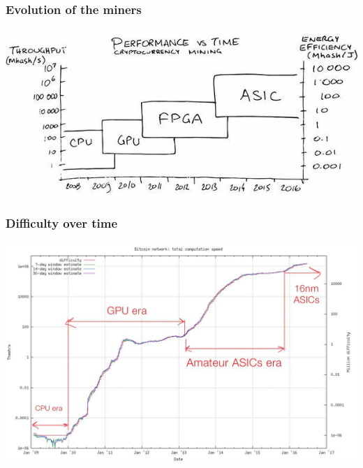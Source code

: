 \documentclass[11pt]{beamer}  %
\begin{document}
\begin{frame}\frametitle{Evolution of the miners}

  \begin{center}
    \includegraphics[scale=0.55,clip=false]{pictures/mining-hardware.jpg}
  \end{center}

\end{frame}

\begin{frame}\frametitle{Difficulty over time}

  \begin{center}
    \includegraphics[width=\textwidth,clip=false]{pictures/difficulty.jpg}
  \end{center}

\end{frame}
\end{document}
